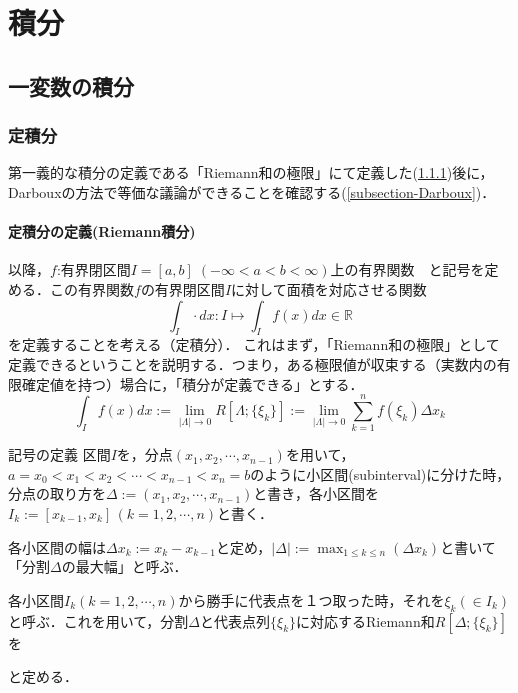 \documentclass[uplatex, dvipdfmx]{jsreport}
\begin{document}
\part{積分}
\chapter{一変数の積分}
\section{定積分}

第一義的な積分の定義である「Riemann和の極限」にて定義した(\ref{subsection-Riemann})後に，Darbouxの方法で等価な議論ができることを確認する(\ref{subsection-Darboux})．


\subsection{定積分の定義(Riemann積分)}\label{subsection-Riemann}

以降，$f$:有界閉区間$I=[a,b]\;(-\infty <a<b< \infty)$上の有界関数　と記号を定める．この有界関数$f$の有界閉区間$I$に対して面積を対応させる関数$$\int_I \cdot dx : I \longmapsto \int_I f(x)dx \in \mathbb{R}$$を定義することを考える（定積分）．
これはまず，「Riemann和の極限」として定義できるということを説明する．つまり，ある極限値が収束する（実数内の有限確定値を持つ）場合に，「積分が定義できる」とする．$$\int_I f(x)dx:=\lim_{|\Lambda|\to 0}R[\Lambda;\{\xi_k\}]:=\lim_{|\Lambda|\to 0}\sum^n_{k=1}f(\xi_k)\Delta x_k$$

\begin{itembox}[l]{記号の定義}
    区間$I$を，分点$(x_1, x_2, \cdots, x_{n-1})$を用いて，$a=x_0<x_1<x_2<\cdots <x_{n-1}<x_n=b$のように小区間(subinterval)に分けた時，分点の取り方を$\Delta :=(x_1, x_2, \cdots, x_{n-1})$と書き，各小区間を$I_k:=[x_{k-1},x_k]\, (k=1,2,\cdots,n)$と書く．

    各小区間の幅は$\Delta x_k := x_k - x_{k-1}$と定め，$|\Delta |:=\max_{1\le k\le n}(\Delta x_k)$と書いて「分割$\Delta$の最大幅」と呼ぶ．

    各小区間$I_k (k=1,2,\cdots,n)$から勝手に代表点を１つ取った時，それを$\xi_k(\in I_k)$と呼ぶ．これを用いて，分割$\Delta$と代表点列$\{ \xi_k \}$に対応するRiemann和$R[\Delta ; \{ \xi_k \}]$を
    \begin{center}\end{center}
    と定める．
\end{itembox}
\end{document}
